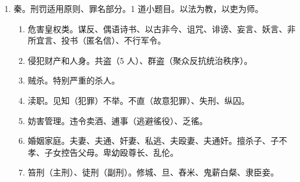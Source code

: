 \begin{enumerate}
\begin{enumerate}
          \item 李悝《法经》。轻罪重刑，明法重刑。第一部比较系统的成文法典。
                \begin{enumerate}
                  \item 六篇。先分后总、程序实体不分。
                        \begin{enumerate}
                          \item 盗。财产。
                          \item 贼。安全。
                          \item 网。囚禁、审判。
                          \item 捕。
                          \item 杂。六禁。淫、狡、城、嬉（赌博）、徒（集会、游行）。
                          \item 具（总则）。加减。
                        \end{enumerate}
                  \item 源头 \yjt
                        商鞅 \yjt
                        汉萧何，增加户（户口）、兴（城市建设）厩（养牛羊马），九章律 \yjt
                        魏晋南北朝，新律 \yjt
                        两晋 \yjt
                        北朝，北齐律 \yjt
                        唐宋明清
                \end{enumerate}
          \item 商鞅变法。改法为律。强调统一适用，普遍调整。通过法律富国强兵，奖励军功。
        \end{enumerate}
  \item 秦。刑罚适用原则、罪名部分。1 道小题目。以法为教，以吏为师。
        \begin{enumerate}
          \item 危害皇权类。谋反、偶语诗书、以古非今、诅咒、诽谤、妄言、妖言、非所宜言、投书（匿名信）、不行军令。
          \item 侵犯财产和人身。共盗（5 人）、群盗（聚众反抗统治秩序）。
          \item 贼杀。特别严重的杀人。
          \item 渎职。见知（犯罪）不举。不直（故意犯罪）、失刑、纵囚。
          \item 妨害管理。违令卖酒、逋事（逃避徭役）、乏徭。
          \item 婚姻家庭。夫妻、夫通、奸妻、私逃、夫殴妻、夫通奸。擅杀子、子不孝、子女控告父母。卑幼殴尊长、乱伦。
          \item 笞刑（主刑）、徒刑（副刑）。修城、旦、舂米、鬼薪白粲、隶臣妾。

\end{enumerate}
\end{enumerate}
